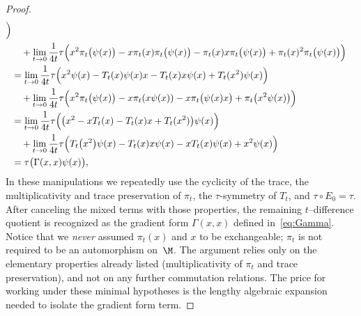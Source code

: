 \documentclass[sn-mathphys-num]{sn-jnl}
\begin{document}
\begin{proof}
\[\begin{aligned}
     \Bigr)                            \\
  &\quad+
     \lim_{t\to0}\frac{1}{4t}
     \tau   \Bigl(
       x^{2}\pi_t   \bigl(\psi(x)\bigr)
       -x  \pi_t(x)\pi_t   \bigl(\psi(x)\bigr)
       -\pi_t(x)  x\pi_t   \bigl(\psi(x)\bigr)
       +\pi_t(x)^{2}\pi_t   \bigl(\psi(x)\bigr)
     \Bigr)                            \\
    &=  \lim_{t\to0}\frac{1}{4t}
     \tau   \Bigl(
       x^{2}\psi(x)-T_t(x)\psi(x)x-T_t(x)  x\psi(x)+T_t(x^{2})\psi(x)
     \Bigr)                            \\
  &\quad+
     \lim_{t\to0}\frac{1}{4t}
     \tau   \Bigl(
       x^{2}\pi_t   \bigl(\psi(x)\bigr)
       -x  \pi_t(x\psi(x))
       -x\pi_t   \bigl(\psi(x)x\bigr)
       +\pi_t   \bigl(x^{2}\psi(x)\bigr)
     \Bigr)                            \\
         &=  \lim_{t\to0}\frac{1}{4t}
     \tau   \Bigl(\bigl(
       x^{2}-xT_t(x)-T_t(x)  x+T_t(x^{2})\bigr)\psi(x)
     \Bigr)                            \\
     &\quad+
     \lim_{t\to0}\frac{1}{4t}
     \tau   \Bigl(
       T_t   \bigl(x^2\bigr)\psi(x)
       -T_t(x)  x\psi(x)
       -xT_t(x)\psi(x)
       +x^{2}\psi(x)
     \Bigr)                            \\
  &= \tau   \bigl(\Gamma(x,x)  \psi(x)\bigr),
\end{aligned}
\]
\noindent
In these manipulations we repeatedly use the cyclicity of the trace, the multiplicativity and trace preservation of $\pi_t$, the $\tau$-symmetry of $T_t$, and
$\tau\circ E_0=\tau$.  After canceling the mixed terms with those
properties, the remaining $t$--difference quotient is recognized as the
gradient form $\Gamma(x,x)$ defined in~\eqref{eq:Gamma}.
\noindent
Notice that we \emph{never} assumed $\pi_t(x)$ and $x$ to be exchangeable;
$\pi_t$ is not required to be an automorphism on~$\M$.
The argument relies only on the elementary properties already listed
(multiplicativity of $\pi_t$
and trace preservation), and not on any further commutation relations.
The price for working under these minimal hypotheses is the
lengthy algebraic expansion needed to isolate the gradient form term.
\end{proof}
\end{document}
